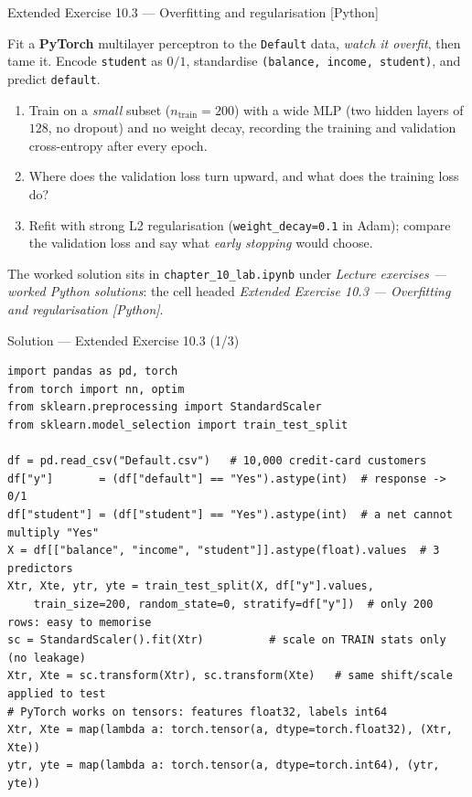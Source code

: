 \documentclass[aspectratio=169,11pt]{beamer}
\begin{document}
\begin{frame}{Extended Exercise 10.3 --- Overfitting and regularisation [Python]}
\begin{longexercise}
  Fit a \textbf{PyTorch} multilayer perceptron to the \texttt{Default} data,
  \emph{watch it overfit}, then tame it. Encode \texttt{student} as $0/1$, standardise
  \texttt{(balance, income, student)}, and predict \texttt{default}.
  \begin{enumerate}
    \item Train on a \emph{small} subset ($n_{\text{train}}=200$) with a wide MLP
          (two hidden layers of $128$, no dropout) and no weight decay, recording the
          training and validation cross-entropy after every epoch.
    \item Where does the validation loss turn upward, and what does the training loss do?
    \item Refit with strong L2 regularisation
          (\texttt{weight\_decay=0.1} in Adam); compare the validation
          loss and say what \emph{early stopping} would choose.
  \end{enumerate}
\end{longexercise}
\begin{labnote}
  The worked solution sits in \texttt{chapter\_10\_lab.ipynb} under
  \emph{Lecture exercises --- worked Python solutions}: the cell headed
  \emph{Extended Exercise 10.3 --- Overfitting and regularisation [Python]}.
\end{labnote}
\end{frame}

\begin{frame}[fragile]{Solution --- Extended Exercise 10.3 (1/3)}
\begin{solutionbox}
\begin{lstlisting}[basicstyle=\ttfamily\scriptsize]
import pandas as pd, torch
from torch import nn, optim
from sklearn.preprocessing import StandardScaler
from sklearn.model_selection import train_test_split

df = pd.read_csv("Default.csv")   # 10,000 credit-card customers
df["y"]       = (df["default"] == "Yes").astype(int)  # response -> 0/1
df["student"] = (df["student"] == "Yes").astype(int)  # a net cannot multiply "Yes"
X = df[["balance", "income", "student"]].astype(float).values  # 3 predictors
Xtr, Xte, ytr, yte = train_test_split(X, df["y"].values,
    train_size=200, random_state=0, stratify=df["y"])  # only 200 rows: easy to memorise
sc = StandardScaler().fit(Xtr)          # scale on TRAIN stats only (no leakage)
Xtr, Xte = sc.transform(Xtr), sc.transform(Xte)   # same shift/scale applied to test
# PyTorch works on tensors: features float32, labels int64
Xtr, Xte = map(lambda a: torch.tensor(a, dtype=torch.float32), (Xtr, Xte))
ytr, yte = map(lambda a: torch.tensor(a, dtype=torch.int64), (ytr, yte))
\end{lstlisting}
\end{solutionbox}
\end{frame}
\end{document}
